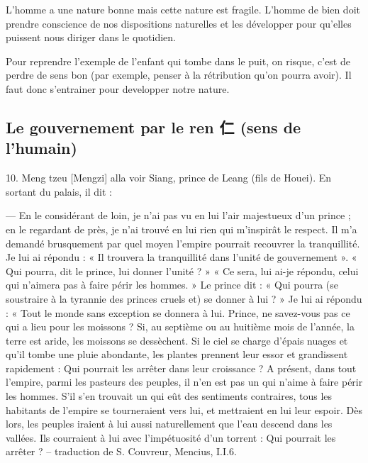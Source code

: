 \begin{Synthesis}
L'homme a une nature bonne mais cette nature est fragile.
L'homme de bien doit prendre conscience de nos dispositions naturelles et les développer pour qu'elles puissent nous diriger dans le quotidien.
\end{Synthesis}

\begin{Ex}
    Pour reprendre l'exemple de l'enfant qui tombe dans le puit, on risque, c'est de perdre de sens bon (par exemple, penser à la rétribution qu'on pourra avoir). Il faut donc s'entrainer pour developper notre nature.
\end{Ex}



 \subsection{Le gouvernement par le ren 仁 (sens de l’humain)}

\begin{singlequote}
10.	Meng tzeu [Mengzi] alla voir Siang, prince de Leang (fils de Houei). En sortant du palais, il dit :

—	En le considérant de loin, je n’ai pas vu en lui l’air majestueux d’un prince ; en le regardant de près, je n’ai trouvé en lui rien qui m’inspirât le respect. Il m’a demandé brusquement par quel moyen l’empire pourrait recouvrer la tranquillité. Je lui ai répondu : « Il trouvera la tranquillité dans l’unité de gouvernement ». « Qui pourra, dit le prince, lui donner l’unité ? » « Ce sera, lui ai-je répondu, celui qui n’aimera pas à faire périr les hommes. » Le prince dit : « Qui pourra (se soustraire à la tyrannie des princes cruels et) se donner à lui ? »
Je lui ai répondu : « Tout le monde sans exception se donnera à lui. Prince, ne savez-vous pas ce qui a lieu pour les moissons ? Si, au septième ou au huitième mois de l’année, la terre est aride, les moissons se dessèchent. Si le ciel se charge d’épais nuages et qu’il tombe une pluie abondante, les plantes prennent leur essor et grandissent rapidement : Qui pourrait les arrêter dans leur croissance ? A présent, dans tout l’empire, parmi les pasteurs des peuples, il n’en est pas un qui n’aime à faire périr les hommes. S’il s’en trouvait un qui eût des sentiments contraires, tous les habitants de l’empire se tourneraient vers lui, et mettraient en lui leur espoir. Dès lors, les peuples iraient à lui aussi naturellement que l’eau descend dans les vallées. Ils courraient à lui avec l’impétuosité d’un torrent : Qui pourrait les arrêter ?
-- traduction de S. Couvreur, Mencius, I.I.6.
    
\end{singlequote}

